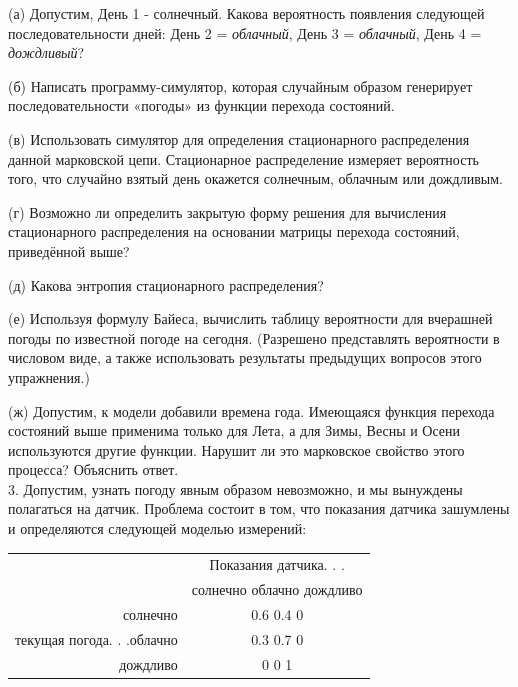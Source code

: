 \documentclass[10pt,a4paper]{article}
\begin{document}
 (а) Допустим, День 1 - солнечный. Какова вероятность появления следующей последовательности дней: День 2 = \textit{облачный}, День 3 = \textit{облачный}, День 4 = \textit{дождливый}?
 
 (б) Написать программу-симулятор, которая случайным образом генерирует последовательности «погоды» из функции перехода состояний.
 
 (в) Использовать симулятор для определения стационарного распределения данной марковской цепи. Стационарное распределение измеряет вероятность того, что случайно взятый день окажется солнечным, облачным или дождливым.
 
 (г) Возможно ли определить закрытую форму решения для вычисления стационарного распределения на основании матрицы перехода состояний, приведённой выше?
  
 (д) Какова энтропия стационарного распределения?
  
 (е) Используя формулу Байеса, вычислить таблицу вероятности для вчерашней погоды по известной погоде на сегодня. (Разрешено представлять вероятности в числовом виде, а также использовать результаты предыдущих вопросов этого упражнения.)
 
 (ж) Допустим, к  модели добавили времена года. Имеющаяся функция перехода состояний выше применима только для Лета, а для Зимы, Весны и Осени используются другие функции. Нарушит ли это марковское свойство этого процесса? Объяснить ответ.\\
  
 3. Допустим, узнать погоду явным образом невозможно, и мы вынуждены полагаться на датчик. 
 Проблема состоит в том, что показания датчика зашумлены и определяются следующей моделью измерений:\\
 \begin{table}[h]
 	\begin{center}
 		\begin{tabular}{|r|c|}
 			\hline
 			{} & Показания датчика. . . \\
 			{} & солнечно \hfill облачно \hfill дождливо \\
 			\hline
 			солнечно & 0.6\hspace{10mm} 0.4\hspace{10mm} 0 \\
 			текущая погода. . .\hfill облачно &    0.3\hspace{10mm} 0.7\hspace{10mm} 0\\
 			дождливо & \hspace{1mm} 0\hspace{12mm} 0\hspace{11mm} 1 \\
 			\hline
 		\end{tabular}
 	\end{center}
 \end{table}\\
 
\end{document}
